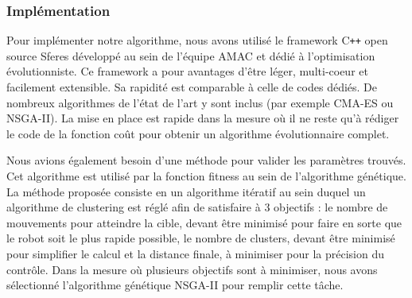 \documentclass[draft]{llncs}
\newcommand*\circled[1]{\tikz[baseline=(char.base)]{
            \node[shape=circle,draw,inner sep=2pt] (char) {#1};}}
\begin{document}
\subsubsection{Implémentation}

Pour implémenter notre algorithme, nous avons utilisé le framework C{}\verb!++! open source Sferes \cite{Mouret2010} développé au sein de l'équipe AMAC et dédié à l'optimisation évolutionniste.
Ce framework a pour avantages d'être léger, multi-coeur et facilement extensible.
Sa rapidité est comparable à celle de codes dédiés.
De nombreux algorithmes de l'état de l'art y sont inclus (par exemple CMA-ES ou NSGA-II).
La mise en place est rapide dans la mesure où il ne reste qu'à rédiger le code de la fonction coût pour obtenir un algorithme évolutionnaire complet.


Nous avions également besoin d'une méthode pour valider les paramètres trouvés.
Cet algorithme est utilisé par la fonction fitness au sein de l'algorithme génétique.
La méthode proposée consiste en un algorithme itératif au sein duquel un algorithme de clustering est réglé afin de satisfaire à 3 objectifs : \circled{1} le nombre de mouvements pour atteindre la cible, devant être minimisé pour faire en sorte que le robot soit le plus rapide possible, \circled{2} le nombre de clusters, devant être minimisé pour simplifier le calcul et \circled{3} la distance finale, à minimiser pour la précision du contrôle.
Dans la mesure où plusieurs objectifs sont à minimiser, nous avons sélectionné l'algorithme génétique NSGA-II\cite{Deb:2002:FEM:2221359.2221582} pour remplir cette tâche.
\end{document}

